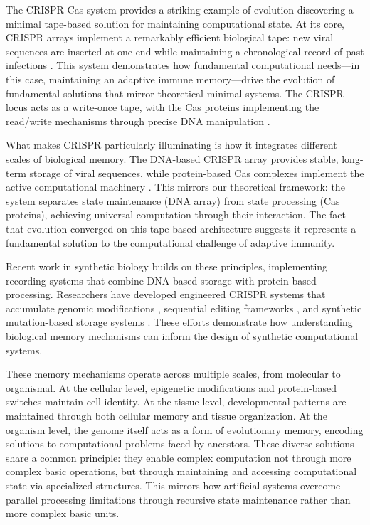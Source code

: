 \documentclass[12pt]{article}
\begin{document}
The CRISPR-Cas system provides a striking example of evolution discovering a minimal tape-based solution for maintaining computational state.
At its core, CRISPR arrays implement a remarkably efficient biological tape: new viral sequences are inserted at one end while maintaining a chronological record of past infections \cite{sheth2017multiplex}.
This system demonstrates how fundamental computational needs---in this case, maintaining an adaptive immune memory---drive the evolution of fundamental solutions that mirror theoretical minimal systems.
The CRISPR locus acts as a write-once tape, with the Cas proteins implementing the read/write mechanisms through precise DNA manipulation \cite{choi2022time}.

What makes CRISPR particularly illuminating is how it integrates different scales of biological memory.
The DNA-based CRISPR array provides stable, long-term storage of viral sequences, while protein-based Cas complexes implement the active computational machinery \cite{sadremomtaz2023digital}.
This mirrors our theoretical framework: the system separates state maintenance (DNA array) from state processing (Cas proteins), achieving universal computation through their interaction.
The fact that evolution converged on this tape-based architecture suggests it represents a fundamental solution to the computational challenge of adaptive immunity.

Recent work in synthetic biology builds on these principles, implementing recording systems that combine DNA-based storage with protein-based processing.
Researchers have developed engineered CRISPR systems that accumulate genomic modifications \cite{sheth2017multiplex}, sequential editing frameworks \cite{choi2022time}, and synthetic mutation-based storage systems \cite{sadremomtaz2023digital}.
These efforts demonstrate how understanding biological memory mechanisms can inform the design of synthetic computational systems.

These memory mechanisms operate across multiple scales, from molecular to organismal.
At the cellular level, epigenetic modifications and protein-based switches maintain cell identity.
At the tissue level, developmental patterns are maintained through both cellular memory and tissue organization.
At the organism level, the genome itself acts as a form of evolutionary memory, encoding solutions to computational problems faced by ancestors.
These diverse solutions share a common principle: they enable complex computation not through more complex basic operations, but through maintaining and accessing computational state via specialized structures.
This mirrors how artificial systems overcome parallel processing limitations through recursive state maintenance rather than more complex basic units.
\end{document}
